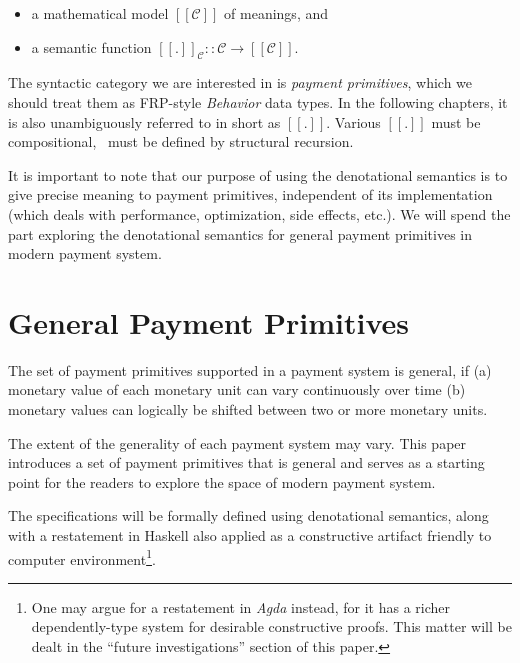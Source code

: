 \begin{itemize}
\item a mathematical model $[\![\mathcal{C}]\!]$ of meanings, and
\item a semantic function $[\![.]\!]_{\mathcal{C}} :: \mathcal{C} \rightarrow [\![\mathcal{C}]\!]$.
\end{itemize}

The syntactic category we are interested in is \textit{payment primitives}, which we should treat
them as FRP-style \textit{Behavior} data types. In the following chapters, it is also unambiguously
referred to in short as $[\![.]\!]$. Various $[\![.]\!]$ must be compositional, \ie\ must be defined
by structural recursion.

It is important to note that our purpose of using the denotational semantics is to give precise
meaning to payment primitives, independent of its implementation (which deals with performance,
optimization, side effects, etc.). We will spend the part \ref{part:gpp} exploring the denotational
semantics for general payment primitives in modern payment system.

\part{General Payment Primitives}\label{part:gpp}

The set of payment primitives supported in a payment system is general, if (a) monetary value of
each monetary unit can vary continuously over time (b) monetary values can logically be shifted
between two or more monetary units.

The extent of the generality of each payment system may vary. This paper introduces a set of payment
primitives that is general and serves as a starting point for the readers to explore the space of
modern payment system.

The specifications will be formally defined using denotational semantics, along with a restatement
in Haskell also applied as a constructive artifact friendly to computer environment\footnote{One may
argue for a restatement in \textit{Agda} instead, for it has a richer dependently-type system for
desirable constructive proofs. This matter will be dealt in the ``future investigations'' section of
this paper.}.

